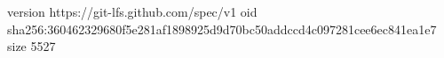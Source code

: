 version https://git-lfs.github.com/spec/v1
oid sha256:360462329680f5e281af1898925d9d70bc50addccd4c097281cee6ec841ea1e7
size 5527
